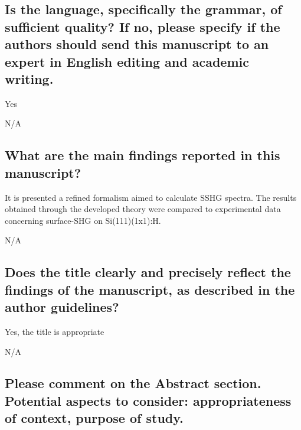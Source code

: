 \documentclass{article}
\begin{document}

\subsection{Is the language, specifically the grammar, of sufficient quality?
If no, please specify if the authors should send this manuscript to an expert in
English editing and academic writing.}

Yes

\begin{shaded}
N/A
\end{shaded}


\subsection{What are the main findings reported in this manuscript?}

It is presented a refined formalism aimed to calculate SSHG spectra. The results
obtained through the developed theory were compared to experimental data
concerning surface-SHG on Si(111)(1x1):H.

\begin{shaded}
N/A
\end{shaded}


\subsection{Does the title clearly and precisely reflect the findings of the
manuscript, as described in the author guidelines?}

Yes, the title is appropriate

\begin{shaded}
N/A
\end{shaded}


\subsection{Please comment on the Abstract section. Potential aspects to
consider: appropriateness of context, purpose of study.}
\end{document}
